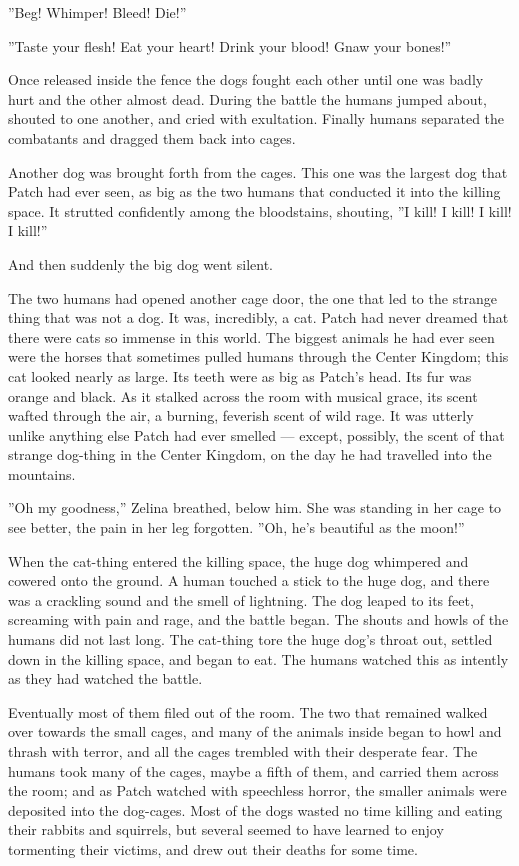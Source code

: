 \documentclass[12pt]{book}
\begin{document}
''Beg! Whimper! Bleed! Die!''

''Taste your flesh! Eat your heart! Drink your blood! Gnaw your bones!''

Once released inside the fence the dogs fought each other until one was badly hurt and the other almost dead. During the battle the humans jumped about, shouted to one another, and cried with exultation. Finally humans separated the combatants and dragged them back into cages. 

Another dog was brought forth from the cages. This one was the largest dog that Patch had ever seen, as big as the two humans that conducted it into the killing space. It strutted confidently among the bloodstains, shouting, ''I kill! I kill! I kill! I kill!''

And then suddenly the big dog went silent.

The two humans had opened another cage door, the one that led to the strange thing that was not a dog. It was, incredibly, a cat. Patch had never dreamed that there were cats so immense in this world. The biggest animals he had ever seen were the horses that sometimes pulled humans through the Center Kingdom; this cat looked nearly as large. Its teeth were as big as Patch's head. Its fur was orange and black. As it stalked across the room with musical grace, its scent wafted through the air, a burning, feverish scent of wild rage. It was utterly unlike anything else Patch had ever smelled ---
except, possibly, the scent of that strange dog-thing in the Center Kingdom, on the day he had travelled into the mountains.

''Oh my goodness,'' Zelina breathed, below him. She was standing in her cage to see better, the pain in her leg forgotten. ''Oh, he's beautiful as the moon!''

When the cat-thing entered the killing space, the huge dog whimpered and cowered onto the ground. A human touched a stick to the huge dog, and there was a crackling sound and the smell of lightning. The dog leaped to its feet, screaming with pain and rage, and the battle began. The shouts and howls of the humans did not last long. The cat-thing tore the huge dog's throat out, settled down in the killing space, and began to eat. The humans watched this as intently as they had watched the battle.

Eventually most of them filed out of the room. The two that remained walked over towards the small cages, and many of the animals inside began to howl and thrash with terror, and all the cages trembled with their desperate fear. The humans took many of the cages, maybe a fifth of them, and carried them across the room; and as Patch watched with speechless horror, the smaller animals were deposited into the dog-cages. Most of the dogs wasted no time killing and eating their rabbits and squirrels, but several seemed to have learned to enjoy tormenting their victims, and drew out their deaths for some time.
\end{document}
